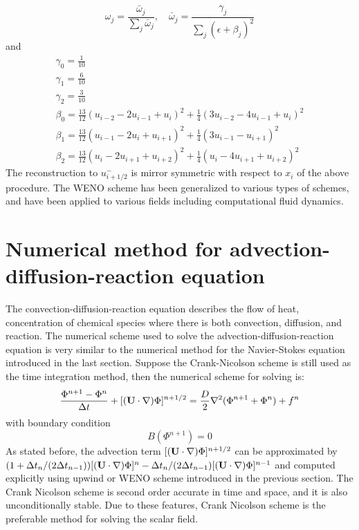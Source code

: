 \begin{equation}
\omega_j = \frac{\bar{\omega}_j}{\sum_j\bar{\omega}_j}, \quad
\bar{\omega}_j = \frac{\gamma_j}{\sum_j(\epsilon + \beta_j)^2}
\end{equation}
and
\begin{eqnarray*}
\gamma_0 = \frac{1}{10}\\
\gamma_1 = \frac{6}{10}\\
\gamma_2 = \frac{3}{10}\\
\beta_0 = \frac{13}{12}(u_{i-2} - 2 u_{i-1} + u_i)^2 + \frac{1}{4}(3u_{i-2} - 4u_{i-1} + u_i)^2 \\
\beta_1 = \frac{13}{12}(u_{i-1} - 2u_i + u_{i+1})^2 + \frac{1}{4}(3u_{i-1} - u_{i+1})^2\\
\beta_2 = \frac{13}{12}(u_i - 2u_{i+1} + u_{i+2})^2 + \frac{1}{4}(u_i - 4u_{i+1} + u_{i+2})^2
\end{eqnarray*}
The reconstruction to $u_{i+1/2}^-$ is mirror symmetric with respect to $x_i$ of the above procedure. The WENO scheme has been generalized to various types of schemes, and have been applied to various fields including computational fluid dynamics.

\section{Numerical method for advection-diffusion-reaction equation}
The convection-diffusion-reaction equation describes the flow of heat, concentration of chemical species where there is both convection, diffusion, and reaction. The numerical scheme used to solve the advection-diffusion-reaction equation is very similar to the numerical method for the Navier-Stokes equation introduced in the last section. Suppose the Crank-Nicolson scheme \cite{crank1947practical} is still used as the time integration method, then the numerical scheme for solving  is:
\begin{equation}
\frac{\Phi^{n+1}-\Phi^n}{\Delta t} + [(\mathbf{U}\cdot\nabla)\Phi]^{n+1/2} = \frac{D}{2}\nabla^2(\Phi^{n+1} + \Phi^n) + f^n
\label{phi_disc_eqn}
\end{equation}
with boundary condition
\begin{equation}
B(\Phi^{n+1}) = 0
\label{phi_bc}
\end{equation}
As stated before, the advection term $[(\mathbf{U}\cdot\nabla)\Phi]^{n+1/2}$ can be approximated by $(1+\Delta t_n/(2\Delta t_{n-1}))[(\mathbf{U}\cdot \nabla)\Phi]^{n} -\Delta t_n/(2\Delta t_{n-1})[(\mathbf{U}\cdot \nabla)\Phi]^{n-1}$ and computed explicitly using upwind or WENO scheme introduced in the previous section. The Crank Nicolson scheme is second order accurate in time and space, and it is also unconditionally stable. Due to these features, Crank Nicolson scheme is the preferable method for solving the scalar field.

